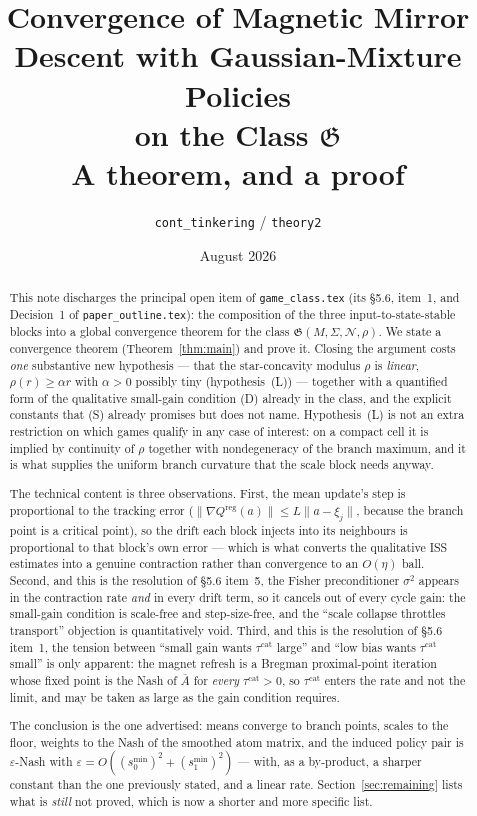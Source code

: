 \documentclass[11pt]{article}
\title{Convergence of Magnetic Mirror Descent with Gaussian-Mixture Policies\\
on the Class $\mathfrak{G}$\\
\large A theorem, and a proof}
\author{\texttt{cont\_tinkering} / \texttt{theory2}}
\date{August 2026}
\theoremstyle{definition}
\newcommand{\cN}{\mathcal{N}}
\begin{document}
\maketitle

\begin{abstract}
This note discharges the principal open item of \texttt{game\_class.tex} (its
\S5.6, item~1, and Decision~1 of \texttt{paper\_outline.tex}): the composition of
the three input-to-state-stable blocks into a global convergence theorem for the
class $\mathfrak{G}(M,\Sigma,\cN,\rho)$. We state a convergence theorem
(Theorem~\ref{thm:main}) and prove it. Closing the argument costs \emph{one}
substantive new hypothesis --- that the star-concavity modulus $\rho$ is
\emph{linear}, $\rho(r) \ge \alpha r$ with $\alpha > 0$ possibly tiny
(hypothesis~(L)) --- together with a quantified form of the qualitative small-gain
condition (D) already in the class, and the explicit constants that (S)
already promises but does not name. Hypothesis~(L) is not an extra restriction on
which games qualify in any case of interest: on a compact cell it is implied by
continuity of $\rho$ together with nondegeneracy of the branch maximum, and it is
what supplies the uniform branch curvature that the scale block needs anyway.

The technical content is three observations. First, the mean update's step is
proportional to the tracking error ($\|\nabla Q^{\mathrm{reg}}(a)\| \le L\|a -
\xi_j\|$, because the branch point is a critical point), so the drift each block
injects into its neighbours is proportional to that block's own error --- which is
what converts the qualitative ISS estimates into a genuine contraction rather
than convergence to an $O(\eta)$ ball. Second, and this is the resolution of
\S5.6 item~5, the Fisher preconditioner $\sigma^2$ appears in the contraction
rate \emph{and} in every drift term, so it cancels out of every cycle gain: the
small-gain condition is scale-free and step-size-free, and the ``scale collapse
throttles transport'' objection is quantitatively void. Third, and this is the
resolution of \S5.6 item~1, the tension between ``small gain wants
$\tau^{\mathrm{cat}}$ large'' and ``low bias wants $\tau^{\mathrm{cat}}$ small''
is only apparent: the magnet refresh is a Bregman proximal-point iteration whose
fixed point is the Nash of $\bar A$ for \emph{every} $\tau^{\mathrm{cat}} > 0$,
so $\tau^{\mathrm{cat}}$ enters the rate and not the limit, and may be taken as
large as the gain condition requires.

The conclusion is the one advertised: means converge to branch points, scales to
the floor, weights to the Nash of the smoothed atom matrix, and the induced
policy pair is $\varepsilon$-Nash with $\varepsilon = O((s^{\min}_0)^2 +
(s^{\min}_1)^2)$ --- with, as a by-product, a sharper constant than the one
previously stated, and a linear rate. Section~\ref{sec:remaining} lists what is
\emph{still} not proved, which is now a shorter and more specific list.
\end{abstract}
\end{document}
